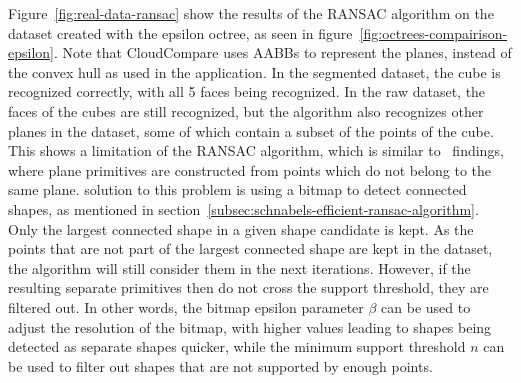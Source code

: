 Figure~\ref{fig:real-data-ransac} show the results of the RANSAC algorithm on the dataset created with the epsilon octree,
as seen in figure~\ref{fig:octrees-compairison-epsilon}.
Note that CloudCompare uses AABBs to represent the planes, instead of the convex hull as used in the application.
In the segmented dataset, the cube is recognized correctly, with all 5 faces being recognized.
In the raw dataset, the faces of the cubes are still recognized, but the algorithm also recognizes other planes in the dataset,
some of which contain a subset of the points of the cube.
This shows a limitation of the RANSAC algorithm, which is similar to~\cite{tarsha-kurdi_hough-transform_2007} findings,
where plane primitives are constructed from points which do not belong to the same plane.
\cite{schnabel_efficient_2007} solution to this problem is using a bitmap to detect connected shapes, as mentioned in section~\ref{subsec:schnabels-efficient-ransac-algorithm}.
Only the largest connected shape in a given shape candidate is kept.
As the points that are not part of the largest connected shape are kept in the dataset, the algorithm will still consider them in the next iterations.
However, if the resulting separate primitives then do not cross the support threshold, they are filtered out.
In other words, the bitmap epsilon parameter $\beta$ can be used to adjust the resolution of the bitmap,
with higher values leading to shapes being detected as separate shapes quicker, while the minimum support threshold $n$
can be used to filter out shapes that are not supported by enough points.

